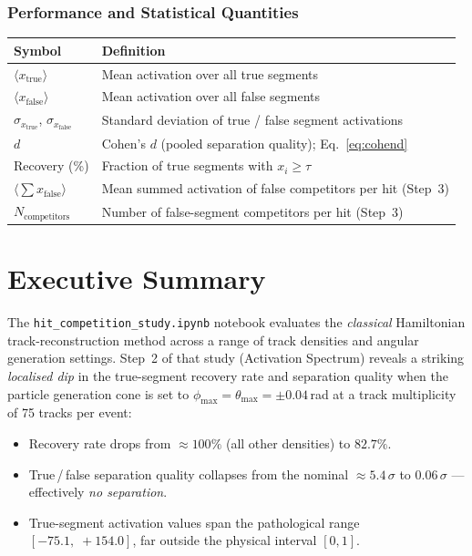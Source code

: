 \documentclass[12pt,a4paper]{article}
\newcommand{\thr}{\tau}        %
\begin{document}
\bigskip
\subsubsection*{Performance and Statistical Quantities}
\begin{tabular}{@{}lp{10.5cm}@{}}
  \toprule
  Symbol & Definition \\
  \midrule
  $\langle x_\text{true}\rangle$ & Mean activation over all true segments \\
  $\langle x_\text{false}\rangle$ & Mean activation over all false segments \\
  $\sigma_{x_\text{true}}$, $\sigma_{x_\text{false}}$ & Standard deviation of true / false segment activations \\
  $d$ & Cohen's $d$ (pooled separation quality); Eq.~\eqref{eq:cohend} \\
  Recovery (\%) & Fraction of true segments with $x_i \geq \thr$ \\
  $\langle\sum x_\text{false}\rangle$ & Mean summed activation of false competitors per hit (Step~3) \\
  $N_\text{competitors}$ & Number of false-segment competitors per hit (Step~3) \\
  \bottomrule
\end{tabular}

\newpage

\section{Executive Summary}
\label{sec:summary}

The \texttt{hit\_competition\_study.ipynb} notebook evaluates the
\emph{classical} Hamiltonian track-reconstruction method across a range of
track densities and angular generation settings.
Step~2 of that study (Activation Spectrum) reveals a striking \emph{localised
dip} in the true-segment recovery rate and separation quality when the particle
generation cone is set to $\phi_{\max} = \theta_{\max} = \pm0.04$\,rad at a
track multiplicity of 75 tracks per event:

\begin{itemize}
  \item Recovery rate drops from $\approx100\%$ (all other densities) to
        $82.7\%$.
  \item True\,/\,false separation quality collapses from the nominal
        ${\approx}5.4\,\sigma$ to $0.06\,\sigma$ — effectively \emph{no
        separation}.
  \item True-segment activation values span the pathological range
        $[-75.1,\;+154.0]$, far outside the physical interval $[0,1]$.
\end{itemize}
\end{document}
